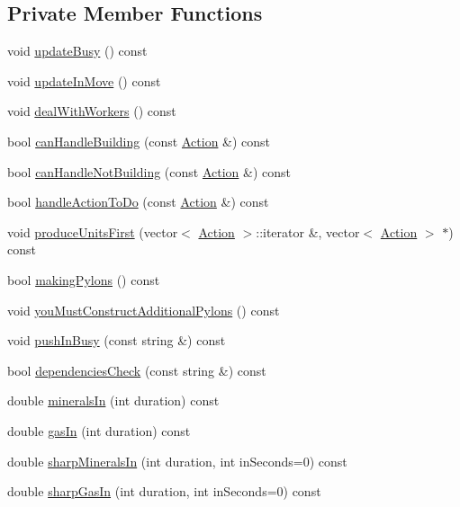 \subsection*{Private Member Functions}
\begin{DoxyCompactItemize}
\item 
void \hyperlink{classghost_1_1BuildOrderObjective_abf798bcb896d5311038e9c882a5314b6}{update\-Busy} () const 
\item 
void \hyperlink{classghost_1_1BuildOrderObjective_a6f1e369381790f195420562d9eb68c66}{update\-In\-Move} () const 
\item 
void \hyperlink{classghost_1_1BuildOrderObjective_af02717f953c7353c5f91adbb6f6b0c58}{deal\-With\-Workers} () const 
\item 
bool \hyperlink{classghost_1_1BuildOrderObjective_af047bf976b44bf4f525ba320370609c8}{can\-Handle\-Building} (const \hyperlink{classghost_1_1Action}{Action} \&) const 
\item 
bool \hyperlink{classghost_1_1BuildOrderObjective_af61b5f5aa5ac311fa64fddbbad52312b}{can\-Handle\-Not\-Building} (const \hyperlink{classghost_1_1Action}{Action} \&) const 
\item 
bool \hyperlink{classghost_1_1BuildOrderObjective_ae19be683aec902dc0cf219434571096b}{handle\-Action\-To\-Do} (const \hyperlink{classghost_1_1Action}{Action} \&) const 
\item 
void \hyperlink{classghost_1_1BuildOrderObjective_a626a838d77e150a3d5946ff240323d11}{produce\-Units\-First} (vector$<$ \hyperlink{classghost_1_1Action}{Action} $>$\-::iterator \&, vector$<$ \hyperlink{classghost_1_1Action}{Action} $>$ $\ast$) const 
\item 
bool \hyperlink{classghost_1_1BuildOrderObjective_a0704c4f68c1a77436dfa88af016cd952}{making\-Pylons} () const 
\item 
void \hyperlink{classghost_1_1BuildOrderObjective_a2f814ebbd373a2aa9fd316f987de352c}{you\-Must\-Construct\-Additional\-Pylons} () const 
\item 
void \hyperlink{classghost_1_1BuildOrderObjective_a1d131785563d450a5c0bd0819bb8d7fe}{push\-In\-Busy} (const string \&) const 
\item 
bool \hyperlink{classghost_1_1BuildOrderObjective_a08f9ed1c0d4a8aaacbe2dc64e3ecffc6}{dependencies\-Check} (const string \&) const 
\item 
double \hyperlink{classghost_1_1BuildOrderObjective_a55f4291cf798d3530161cc30c04be9f4}{minerals\-In} (int duration) const 
\item 
double \hyperlink{classghost_1_1BuildOrderObjective_ac47b4cf4499805d98d2daeb506435130}{gas\-In} (int duration) const 
\item 
double \hyperlink{classghost_1_1BuildOrderObjective_a3c3deeffad2171024cf026b078214b91}{sharp\-Minerals\-In} (int duration, int in\-Seconds=0) const 
\item 
double \hyperlink{classghost_1_1BuildOrderObjective_a19352d224173dd3073e69565f45096a4}{sharp\-Gas\-In} (int duration, int in\-Seconds=0) const 
\end{DoxyCompactItemize}


